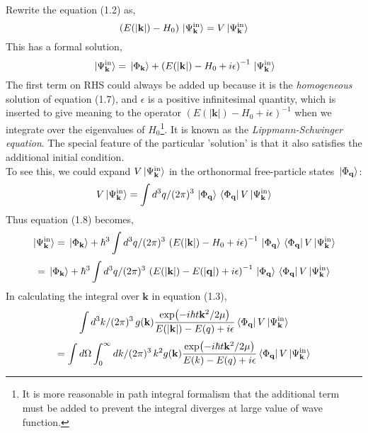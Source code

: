 \documentclass[12pt]{article}
\numberwithin{equation}{section}
\begin{document}
Rewrite the equation (1.2) as,
\begin{equation}
    \left(E(|\mathbf{k}|)-H_0\right)\ket*{\Psi_{\mathbf{k}}^{\text{in}}} = V\ket*{\Psi_{\mathbf{k}}^{\text{in}}}
\end{equation}
This has a formal solution,
\begin{equation}
    \ket*{\Psi_{\mathbf{k}}^{\text{in}}} = \ket*{\Phi_{\mathbf{k}}} + \left(E(|\mathbf{k}|)-H_0+i\epsilon\right)^{-1}\ket*{\Psi_{\mathbf{k}}^{\text{in}}}
\end{equation}
The first term on RHS could always be added up because it is the \textit{homogeneous} solution of equation (1.7), and $\epsilon$ is a positive infinitesimal quantity, which is inserted to give meaning to the operator $(E(|\mathbf{k}|)-H_0+i\epsilon)^{-1}$ when we integrate over the eigenvalues of $H_0$\footnote{It is more reasonable in path integral formalism that the additional term must be added to prevent the integral diverges at large value of wave function.}.
It is known as the \textit{Lippmann-Schwinger equation}.
The special feature of the particular 'solution' is that it also satisfies the additional initial condition.
\\\indent To see this, we could expand $V\ket*{\Psi_{\mathbf{k}}^{\text{in}}}$ in the orthonormal free-particle states $\ket*{\Phi_{\mathbf{q}}}$:
\begin{equation}
    V\ket*{\Psi_{\mathbf{k}}^{\text{in}}} = \int{d^3q/(2\pi)^3\,\ket*{\Phi_{\mathbf{q}}}\bra*{\Phi_{\mathbf{q}}}V\ket*{\Psi_{\mathbf{k}}^{\text{in}}}}
\end{equation}
Thus equation (1.8) becomes,
\[\ket*{\Psi_{\mathbf{k}}^{\text{in}}} = \ket*{\Phi_{\mathbf{k}}} + \hbar^3\int{d^3q/(2\pi)^3\,\left(E(|\mathbf{k}|) - H_0 + i\epsilon\right)^{-1}\ket*{\Phi_{\mathbf{q}}}\bra*{\Phi_{\mathbf{q}}}V\ket*{\Psi_{\mathbf{k}}^{\text{in}}}}\]
\begin{equation}
    = \ket*{\Phi_{\mathbf{k}}} + \hbar^3\int{d^3q/(2\pi)^3\,\left(E(|\mathbf{k}|) - E(|\mathbf{q}|) + i\epsilon\right)^{-1}\ket*{\Phi_{\mathbf{q}}}\bra*{\Phi_{\mathbf{q}}}V\ket*{\Psi_{\mathbf{k}}^{\text{in}}}}
\end{equation}
In calculating the integral over $\mathbf{k}$ in equation (1.3),
\[\int{d^3k/(2\pi)^3\,g(\mathbf{k})\frac{\exp(-i\hbar t\mathbf{k}^2/2\mu)}{E(|\mathbf{k}|)-E(q)+i\epsilon}\bra*{\Phi_{\mathbf{q}}}V\ket*{\Psi_{\mathbf{k}}^{\text{in}}}}\]
\[=\int{d\Omega}\int_{0}^{\infty}{dk/(2\pi)^3\,k^2g(\mathbf{k})}\frac{\exp(-i\hbar t\mathbf{k}^2/2\mu)}{E(k)-E(q)+i\epsilon}\bra*{\Phi_{\mathbf{q}}}V\ket*{\Psi_{\mathbf{k}}^{\text{in}}}\]
\end{document}
